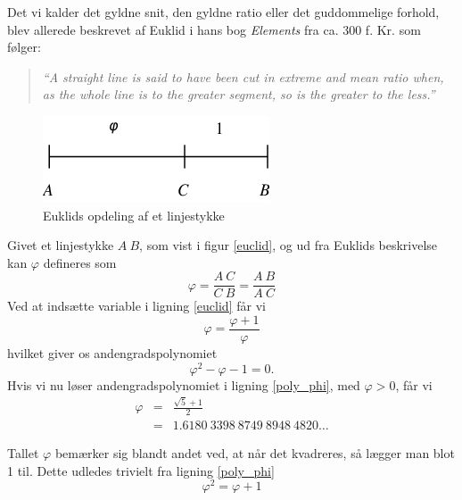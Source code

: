 {
Det vi kalder det gyldne snit, den gyldne ratio eller det guddommelige
forhold, blev allerede beskrevet af Euklid i hans bog \emph{Elements}
fra ca. 300 f.  Kr. som følger:
\begin{quote}
	\emph{``A straight line is said to have been cut in extreme
	and mean ratio when, as the whole line is to the greater
	segment, so is the greater to the less.''}\cite{Euclid300bc}
\end{quote}

\begin{figure}[h!]
	\begin{center}
		\includegraphics[scale=0.49,angle=0]{afsnit/baggrund/billeder/line_segment_a_c_b}
	\end{center}
	\caption{Euklids opdeling af et linjestykke}
	\label{line_segment}
\end{figure}

Givet et linjestykke $A\ B$, som vist i figur \ref{euclid}, og ud fra
Euklids beskrivelse kan $\varphi$ defineres som
\begin{equation}
	\varphi	= \frac{A\ C}{C\ B} = \frac{A\ B}{A\ C}
	\label{euclid}
\end{equation}
Ved at indsætte variable i ligning \ref{euclid} får vi
\begin{equation}
	\varphi = \frac{\varphi + 1}{\varphi}
	\label{expand_euclid}
\end{equation}
hvilket giver os andengradspolynomiet
\begin{equation}
	\varphi^{2} - \varphi - 1 = 0.
	\label{poly_phi}
\end{equation}
Hvis vi nu løser andengradspolynomiet i ligning \ref{poly_phi}, med
$\varphi > 0$, får vi
\begin{eqnarray*}
	\varphi	& =	& \frac{\sqrt{5} + 1}{2} \\
		& =	& 1.6180\ 3398\ 8749\ 8948\ 4820 \dots
\end{eqnarray*}

Tallet $\varphi$ bemærker sig blandt andet ved, at når det kvadreres, så
lægger man blot 1 til. Dette udledes trivielt fra ligning \ref{poly_phi}
\begin{equation}
	\varphi^{2} = \varphi + 1
	\label{phi_squared}
\end{equation}

}
